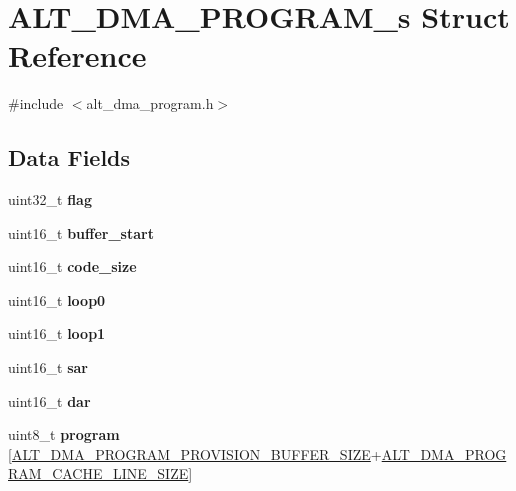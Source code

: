 \hypertarget{structALT__DMA__PROGRAM__s}{}\section{A\+L\+T\+\_\+\+D\+M\+A\+\_\+\+P\+R\+O\+G\+R\+A\+M\+\_\+s Struct Reference}
\label{structALT__DMA__PROGRAM__s}


{\ttfamily \#include $<$alt\+\_\+dma\+\_\+program.\+h$>$}

\subsection*{Data Fields}
\begin{DoxyCompactItemize}
\item 
\mbox{\label{structALT__DMA__PROGRAM__s_ac842960f8614ff8e32943125bae3b394}} 
uint32\+\_\+t {\bfseries flag}
\item 
\mbox{\label{structALT__DMA__PROGRAM__s_a683bf6e7f2f4a17605bf379238b75392}} 
uint16\+\_\+t {\bfseries buffer\+\_\+start}
\item 
\mbox{\label{structALT__DMA__PROGRAM__s_a9a73631c28cf793ed76da9a74d608fa8}} 
uint16\+\_\+t {\bfseries code\+\_\+size}
\item 
\mbox{\label{structALT__DMA__PROGRAM__s_a4c82df774932215b32d5bda12ba2d85c}} 
uint16\+\_\+t {\bfseries loop0}
\item 
\mbox{\label{structALT__DMA__PROGRAM__s_a239b1a9977fe2dd36797c8e9aa3fbe69}} 
uint16\+\_\+t {\bfseries loop1}
\item 
\mbox{\label{structALT__DMA__PROGRAM__s_a8fc2e6ba39691de68cd06808d7dd5158}} 
uint16\+\_\+t {\bfseries sar}
\item 
\mbox{\label{structALT__DMA__PROGRAM__s_a1867bb14ac2811dd63923e5a483cc272}} 
uint16\+\_\+t {\bfseries dar}
\item 
\mbox{\label{structALT__DMA__PROGRAM__s_a7f1ca7bdbdb630ea804601571fc4ef8c}} 
uint8\+\_\+t {\bfseries program} \mbox{[}\mbox{\hyperlink{group__ALT__DMA__PRG_gad2247d4b56108fe0ab3690c2bc1b6d08}{A\+L\+T\+\_\+\+D\+M\+A\+\_\+\+P\+R\+O\+G\+R\+A\+M\+\_\+\+P\+R\+O\+V\+I\+S\+I\+O\+N\+\_\+\+B\+U\+F\+F\+E\+R\+\_\+\+S\+I\+ZE}}+\mbox{\hyperlink{group__ALT__DMA__PRG_gae9006d74c88b55b9b19e8b51882dc345}{A\+L\+T\+\_\+\+D\+M\+A\+\_\+\+P\+R\+O\+G\+R\+A\+M\+\_\+\+C\+A\+C\+H\+E\+\_\+\+L\+I\+N\+E\+\_\+\+S\+I\+ZE}}\mbox{]}
\end{DoxyCompactItemize}


